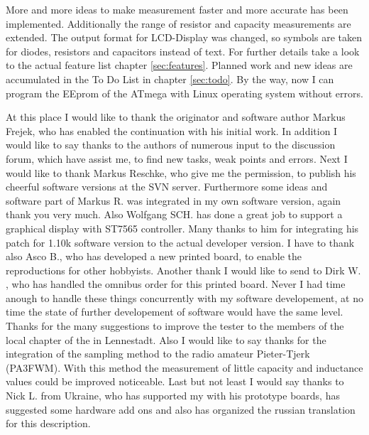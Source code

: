 More and more ideas to make measurement faster and more accurate has been implemented.
Additionally the range of resistor and capacity measurements are extended.
The output format for LCD-Display was changed, so symbols are taken for diodes, resistors and capacitors instead of text.
For further details take a look to the actual feature list chapter \ref{sec:features}.
Planned work and new ideas are accumulated in the To Do List in chapter \ref{sec:todo}.
By the way, now I can program the EEprom of the ATmega with Linux operating system without errors.

At this place I would like to thank the originator and software author Markus Frejek, who has enabled the continuation
with his initial work.
In addition I would like to say thanks to the authors of numerous input to the discussion forum, which have assist me, to
find new tasks, weak points and errors.
Next I would like to thank Markus Reschke, who give me the permission, to publish his cheerful software versions at the
SVN server. Furthermore some ideas and software part of Markus R. was integrated in my own software version,
again thank you very much.
Also Wolfgang SCH. has done a great job to support a graphical display with ST7565 controller. Many thanks to him
for integrating his patch for 1.10k software version to the actual developer version.
I have to thank also Asco B., who has developed a new printed board, to enable the reproductions for other hobbyists.
Another thank I would like to send to Dirk W. , who has handled the omnibus order for this printed board.
Never I had time anough to handle these things concurrently with my software developement, at no time the state of further
developement of software would have the same level.
Thanks for the many suggestions to improve the tester to the members of the local chapter of the 
in Lennestadt.
Also I would like to say thanks for the integration of the sampling method to the radio amateur Pieter-Tjerk (PA3FWM).
With this method the measurement of little capacity and inductance values could be improved noticeable.
Last but not least I would say thanks to Nick L. from Ukraine, who has supported my with his prototype boards, 
has suggested some hardware add ons and also has organized the russian translation for this description.

